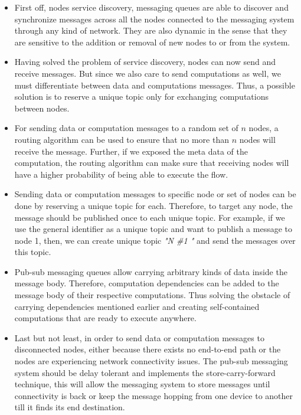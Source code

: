 \begin{itemize}
\item First off, nodes service discovery, messaging queues are able to discover and synchronize messages across all the nodes connected to the messaging system through any kind of network.  They are also dynamic in the sense that they are sensitive to the addition or removal of new nodes to or from the system. 

\item  Having solved the problem of service discovery, nodes can now send and receive messages. But since we also care to send computations as well, we must differentiate between data  and computations messages. Thus, a possible solution is to reserve a unique topic only for exchanging computations between nodes.

\item For sending data or computation messages to a random set of  \(n\) nodes, a routing algorithm can be used to ensure that no more than \(n\) nodes will receive the message. Further, if we exposed the meta data of the computation, the routing algorithm can make sure that receiving nodes will have a higher probability of being able to execute the flow.

\item Sending data or computation messages to specific node or set of nodes can be done by reserving a unique topic for each. Therefore, to target any node, the message should be published once to each unique topic. For example, if we use the general identifier as a unique topic and want to publish a message to node 1, then, we can create  unique topic \textit{"N \#1 "} and send the messages over this topic.

 
\item Pub-sub messaging queues allow carrying arbitrary kinds of data inside the message body. Therefore, computation dependencies can be  added to the message body of their respective computations. Thus solving the obstacle of carrying dependencies mentioned earlier and creating self-contained computations that are ready to execute anywhere.

\item Last but not least, in order to send data or computation messages to disconnected nodes, either because there exists no end-to-end path or the nodes are experiencing network connectivity issues. The pub-sub messaging system should be delay tolerant and implements the store-carry-forward technique, this will allow the messaging system to store messages until connectivity is back or keep the message hopping from one device to another till it finds its end destination.
\end{itemize}

